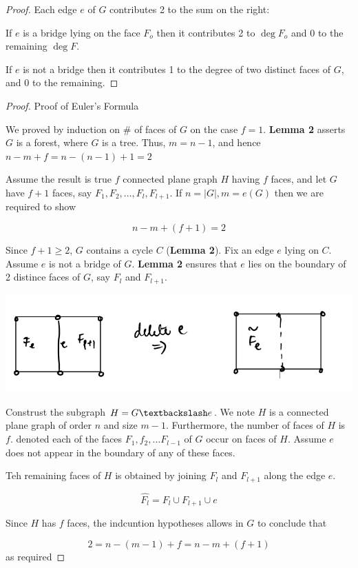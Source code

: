 \documentclass[12pt]{article}
\newenvironment{pro}{\begin{proof}}{\end{proof}}
\begin{document}
\begin{pro}
  Each edge $e$ of $G$ contributes 2 to the sum on the right:

  If $e$ is a bridge lying on the face $F_{o}$ then it contributes 2 to $\deg F_{o}$ and 0 to the remaining $\deg F$.


  If $e$ is not a bridge then it contributes 1 to the degree of two distinct faces of $G$, and 0 to the remaining.
\end{pro}


\begin{pro}

  Proof of Euler's Formula

  We proved by induction on $\#$ of faces of $G$ on the case $f=1$. \textbf{Lemma 2} asserts $G$ is a forest, where $G$ is a tree.
  Thus, $m=n-1$, and hence $n-m +f = n-(n-1)+1 = 2$

  Assume the result is true $f$ connected plane graph $H$ having $f$ faces, and let $G$ have $f+1$ faces, say $F_{1}, F_{2}, \dots, F_{l}, F_{l+1}$.
  If $n = \vert G\vert, m = e(G)$ then we are required to show

  \[n-m +(f+1) = 2\]

  Since $f+1\ge 2$, $G$ contains a cycle $C$ (\textbf{Lemma 2}). Fix an edge $e$ lying on $C$. Assume $e$ is not a bridge of $G$. \textbf{Lemma 2} ensures that $e$ lies on the boundary of 2 distince faces of $G$, say $F_{l}$ and $F_{l+1}$.

  \includegraphics[scale=0.5]{eulerproof}

  Construst the subgraph $H=G\textbackslash e$. We note $H$ is a connected plane graph of order $n$ and size $m-1$.
  Furthermore, the number of faces of $H$ is $f$. denoted each of the faces $F_{1}, f_{2},\dots F_{l-1}$ of $G$ occur on faces of $H$. Assume $e$ does not appear in the boundary of any of these faces.

  Teh remaining faces of $H$ is obtained by joining $F_{l}$ and $F_{l+1}$ along the edge $e$.

  \[\hat{F_{l}} = F_{l} \cup F_{l+1} \cup e\]

  Since $H$ has $f$ faces, the indcuntion hypotheses allows in $G$ to conclude that

  \[ 2 = n- (m-1) + f = n - m + (f+1)\]
  as required

\end{pro}
\end{document}
